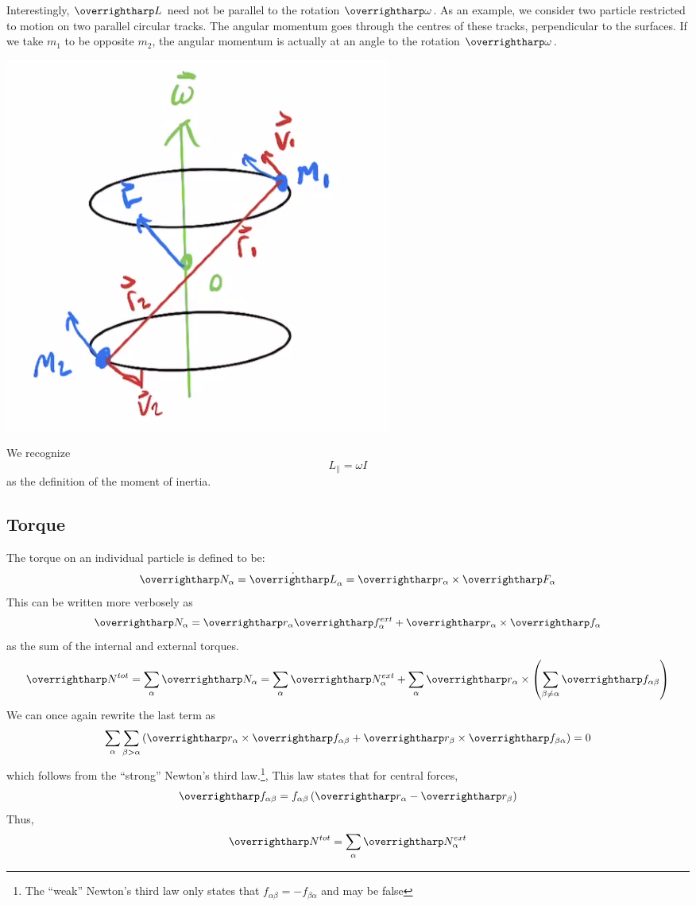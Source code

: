 Interestingly, \(\vv{L}\) need not be parallel to the rotation \(\vv{\omega}\). As an example, we consider two particle restricted to motion on two parallel circular tracks. The angular momentum goes through the centres of these tracks, perpendicular to the surfaces. If we take \(m_1\) to be opposite \(m_2\), the angular momentum is actually at an angle to the rotation \(\vv\omega\). 
\begin{center}
	\includegraphics[scale = 0.4]{lwcounter.png}
\end{center}

We recognize
\begin{equation}
	L_\parallel = \omega I
\end{equation}
as the definition of the moment of inertia.

\subsection{Torque}
The torque on an individual particle is defined to be:
\begin{equation}
	\vv{N}_\alpha = \dot{\vv L}_\alpha = \vv r_\alpha \times \vv F_\alpha
\end{equation}
This can be written more verbosely as
\[\vv N_\alpha = \vv r_\alpha \vv{f}_\alpha^{ext} + \vv r_\alpha\times \vv f_\alpha\]
as the sum of the internal and external torques.
\[\vv{N}^{tot} = \sum_\alpha \vv{N}_\alpha = \sum_\alpha \vv{N}_\alpha^{ext} + \sum_\alpha\vv r_\alpha\times \left(\sum_{\beta \neq \alpha} \vv f_{\alpha\beta}\right)\]
We can once again rewrite the last term as
\[\sum_\alpha\sum_{\beta>\alpha} \left(\vv r_\alpha \times\vv f_{\alpha\beta}+\vv r_\beta \times \vv f_{\beta\alpha}\right)=0\]
which follows from the ``strong'' Newton's third law.\footnote{The ``weak'' Newton's third law only states that \(f_{\alpha\beta} = -f_{\beta\alpha}\) and may be false}, This law states that for central forces, 
\[\vv f_{\alpha\beta} = f_{\alpha\beta} \left(\vv r_\alpha- \vv r_{\beta}\right)\]
Thus,
\begin{equation}
	\vv{N}^{tot} = \sum_\alpha \vv N_\alpha^{ext}
\end{equation}

